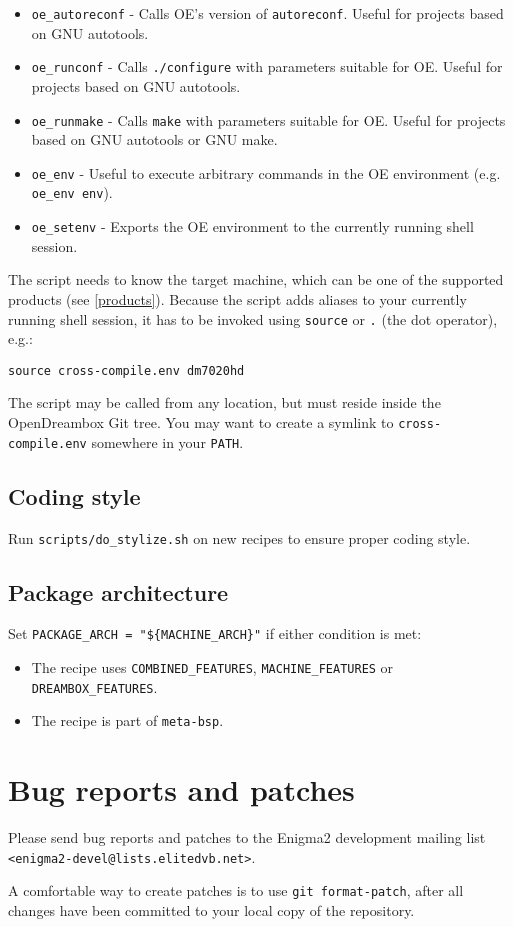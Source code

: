 \documentclass[a4paper]{article}
\newcommand{\shell}[1]{\texttt{\small #1}}
\begin{document}
    \begin{itemize}
      \item \shell{oe\_autoreconf} - Calls OE's version of \shell{autoreconf}. Useful for projects based on GNU autotools.
      \item \shell{oe\_runconf} - Calls \shell{./configure} with parameters suitable for OE. Useful for projects based on GNU autotools.
      \item \shell{oe\_runmake} - Calls \shell{make} with parameters suitable for OE. Useful for projects based on GNU autotools or GNU make.
      \item \shell{oe\_env} - Useful to execute arbitrary commands in the OE environment (e.g. \shell{oe\_env env}).
      \item \shell{oe\_setenv} - Exports the OE environment to the currently running shell session.
    \end{itemize}

    The script needs to know the target machine, which can be one of the supported products (see \ref{products}). Because the script
    adds aliases to your currently running shell session, it has to be invoked using \shell{source} or \shell{.} (the dot operator), e.g.:

    \shell{source cross-compile.env dm7020hd}

    The script may be called from any location, but must reside inside the OpenDreambox Git tree.
    You may want to create a symlink to \shell{cross-compile.env} somewhere in your \shell{PATH}.

  \subsection{Coding style}
    Run \shell{scripts/do\_stylize.sh} on new recipes to ensure proper coding style.

  \subsection {Package architecture}
    Set \shell{PACKAGE\_ARCH = "\$\{MACHINE\_ARCH\}"} if either condition is met:
    \begin{itemize}
      \item The recipe uses \shell{COMBINED\_FEATURES}, \shell{MACHINE\_FEATURES} or \shell{DREAMBOX\_FEATURES}.
      \item The recipe is part of \shell{meta-bsp}.
    \end{itemize}

\section{Bug reports and patches}

  Please send bug reports and patches to the Enigma2 development mailing list \shell{<enigma2-devel@lists.elitedvb.net>}.

  A comfortable way to create patches is to use \shell{git format-patch}, after all changes have been committed to your
  local copy of the repository.
\end{document}
